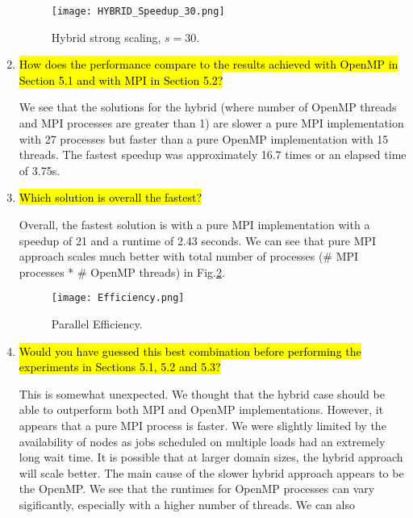 \documentclass{article}
\begin{document}
\begin{enumerate}
	\begin{figure}[p] %
	 	\begin{center}
	 		\texttt{[image: HYBRID\_Speedup\_30.png]} %
	 		\caption{Hybrid strong scaling, $s=30$.}
	 		\label{fig:hybrid_strongscaling_s30}
	 	\end{center}
	\end{figure}
	
	\item \hl{How does the performance compare to the results achieved with OpenMP in Section 5.1 and with MPI in Section 5.2?}

	We see that the solutions for the hybrid (where number of OpenMP threads and MPI processes are greater than 1) are slower a pure MPI implementation with 27 processes but faster than a pure OpenMP implementation with 15 threads. The fastest speedup was approximately 16.7 times or an elapsed time of 3.75s. 
	
	\item \hl{Which solution is overall the fastest?}

	Overall, the fastest solution is with a pure MPI implementation with a speedup of 21 and a runtime of 2.43 seconds. We can see that pure MPI approach scales much better with total number of processes (\# MPI processes * \# OpenMP threads) in Fig.\ref{fig:efficiency}.
	
		\begin{figure}[p] %
	 	\begin{center}
	 		\texttt{[image: Efficiency.png]} %
	 		\caption{Parallel Efficiency.}
	 		\label{fig:efficiency}
	 	\end{center}
	\end{figure}
	
	\item \hl{Would you have guessed this best combination before performing the experiments in Sections 5.1, 5.2 and 5.3?}

	This is somewhat unexpected. We thought that the hybrid case should be able to outperform both MPI and OpenMP implementations. However, it appears that a pure MPI process is faster. We were slightly limited by the availability of nodes as jobs scheduled on multiple loads had an extremely long wait time. It is possible that at larger domain sizes, the hybrid approach will scale better. The main cause of the slower hybrid approach appears to be the OpenMP. We see that the runtimes for OpenMP processes can vary sigificantly, especially with a higher number of threads. We can also 
\end{enumerate}
\end{document}
